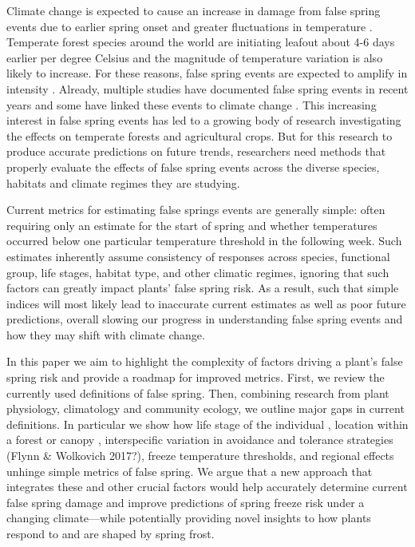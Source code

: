 \documentclass{article}\usepackage[]{graphicx}\usepackage[]{color}
\begin{document}
Climate change is expected to cause an increase in damage from false spring events due to earlier spring onset and greater fluctuations in temperature \citep{Cannell1986, Inouye2008, Martin2010}. Temperate forest species around the world are initiating leafout about 4-6 days earlier per degree Celsius \citep{Wolkovich2012, Polgar2014} and the magnitude of temperature variation is also likely to increase. For these reasons, false spring events are expected to amplify in intensity \citep{Kodra2011, Allstadt2015}. Already, multiple studies have documented false spring events in recent years \citep{Gu2008, Augspurger2009, Knudson2012, Augspurger2013} and some have linked these events to climate change \citep{Ault2013, Allstadt2015, Muffler2016, Xin2016}. This increasing interest in false spring events has led to a growing body of research investigating the effects on temperate forests and agricultural crops. But for this research to produce accurate predictions on future trends, researchers need methods that properly evaluate the effects of false spring events across the diverse species, habitats and climate regimes they are studying. 

Current metrics for estimating false springs events are generally simple: often requiring only an estimate for the start of spring and whether temperatures occurred below one particular temperature threshold in the following week. Such estimates inherently assume consistency of responses across species, functional group, life stages, habitat type, and other climatic regimes, ignoring that such factors can greatly impact plants' false spring risk. As a result, such that simple indices will most likely lead to inaccurate current estimates as well as poor future predictions, overall slowing our progress in understanding false spring events and how they may shift with climate change. 

In this paper we aim to highlight the complexity of factors driving a plant's false spring risk and provide a roadmap for improved metrics. First, we review the currently used definitions of false spring. Then, combining research from plant physiology, climatology and community ecology, we outline major gaps in current definitions. In particular we show how life stage of the individual \citep{Caffarra2011}, location within a forest or canopy \citep{Augspurger2013}, interspecific variation in avoidance and tolerance strategies (Flynn \& Wolkovich 2017?), freeze temperature thresholds, and regional effects \citep{Martin2010} unhinge simple metrics of false spring. We argue that a new approach that integrates these and other crucial factors would help accurately determine current false spring damage and improve predictions of spring freeze risk under a changing climate---while potentially providing novel insights to how plants respond to and are shaped by spring frost. %
\end{document}
